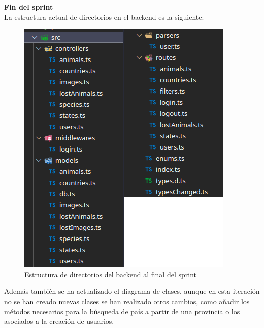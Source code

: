 \Large{\textbf{Fin del sprint}} \\

La estructura actual de directorios en el backend es la siguiente: 

\begin{figure}[H]
	\centering
	\includegraphics[width=0.7\linewidth]{"sprint 2/directoriosBackS2"}
	\caption{Estructura de directorios del backend al final del sprint}
	\label{fig:directoriosbacks2}
\end{figure}

Además también se ha actualizado el diagrama de clases, aunque en esta iteración no se han creado nuevas clases se han realizado otros cambios, como añadir los métodos necesarios para la búsqueda de país a partir de una provincia o los asociados a la creación de usuarios.

